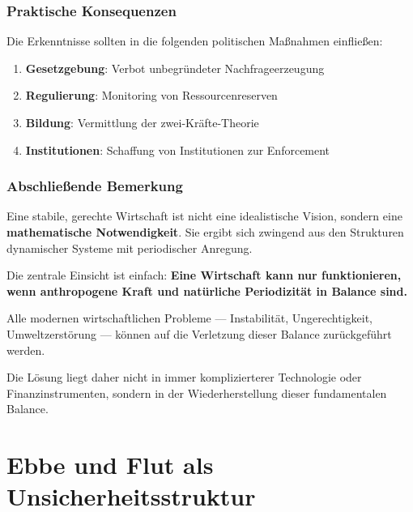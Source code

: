 \documentclass[a4paper, 12pt, twoside, openright]{report}
\theoremstyle{definition}
\theoremstyle{definition}
\begin{document}
\subsection{Praktische Konsequenzen}

Die Erkenntnisse sollten in die folgenden politischen Maßnahmen einfließen:

\begin{enumerate}
    \item \textbf{Gesetzgebung}: Verbot unbegründeter Nachfrageerzeugung
    \item \textbf{Regulierung}: Monitoring von Ressourcenreserven
    \item \textbf{Bildung}: Vermittlung der zwei-Kräfte-Theorie
    \item \textbf{Institutionen}: Schaffung von Institutionen zur Enforcement
\end{enumerate}

\subsection{Abschließende Bemerkung}

Eine stabile, gerechte Wirtschaft ist nicht eine idealistische Vision, sondern eine \textbf{mathematische Notwendigkeit}. Sie ergibt sich zwingend aus den Strukturen dynamischer Systeme mit periodischer Anregung.

Die zentrale Einsicht ist einfach: \textbf{Eine Wirtschaft kann nur funktionieren, wenn anthropogene Kraft und natürliche Periodizität in Balance sind.}

Alle modernen wirtschaftlichen Probleme --- Instabilität, Ungerechtigkeit, Umweltzerstörung --- können auf die Verletzung dieser Balance zurückgeführt werden.

Die Lösung liegt daher nicht in immer komplizierterer Technologie oder Finanzinstrumenten, sondern in der Wiederherstellung dieser fundamentalen Balance.

\cleardoublepage


\chapter{Ebbe und Flut als Unsicherheitsstruktur}
\label{ch:tidal-uncertainty}

\end{document}
